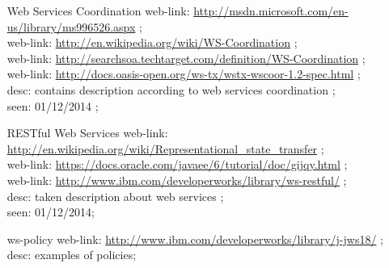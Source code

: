 {\begin{enumerate}
\item [Web Services Coordination] web-link: \url{http://msdn.microsoft.com/en-us/library/ms996526.aspx} ; \\
web-link: \url{http://en.wikipedia.org/wiki/WS-Coordination} ; \\
web-link: \url{http://searchsoa.techtarget.com/definition/WS-Coordination} ; \\ 
web-link: \url{http://docs.oasis-open.org/ws-tx/wstx-wscoor-1.2-spec.html} ; \\ desc: contains description according to web services coordination ; \\ seen: 01/12/2014 ; \\
\item [RESTful Web Services] web-link: \url{http://en.wikipedia.org/wiki/Representational_state_transfer} ; \\
web-link: \url{https://docs.oracle.com/javaee/6/tutorial/doc/gijqy.html} ; \\ 
web-link: \url{http://www.ibm.com/developerworks/library/ws-restful/} ; \\ desc: taken description about web services ; \\ seen: 01/12/2014; \\
\item [ws-policy] web-link: 
\url{http://www.ibm.com/developerworks/library/j-jws18/} ; \\ desc: examples of policies; \
\end{enumerate}
}

